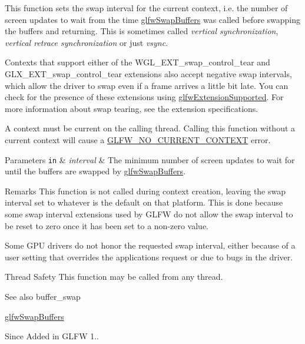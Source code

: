 This function sets the swap interval for the current context, i.\+e. the number of screen updates to wait from the time \hyperlink{group__window_gafb827800eedbfcbc97b1e5408df668d7}{glfw\+Swap\+Buffers} was called before swapping the buffers and returning. This is sometimes called {\itshape vertical synchronization}, {\itshape vertical retrace synchronization} or just {\itshape vsync}.

Contexts that support either of the {\ttfamily W\+G\+L\+\_\+\+E\+X\+T\+\_\+swap\+\_\+control\+\_\+tear} and {\ttfamily G\+L\+X\+\_\+\+E\+X\+T\+\_\+swap\+\_\+control\+\_\+tear} extensions also accept negative swap intervals, which allow the driver to swap even if a frame arrives a little bit late. You can check for the presence of these extensions using \hyperlink{group__context_ga9a28c712d35f9e43534e1d03b051c04c}{glfw\+Extension\+Supported}. For more information about swap tearing, see the extension specifications.

A context must be current on the calling thread. Calling this function without a current context will cause a \hyperlink{group__errors_gaa8290386e9528ccb9e42a3a4e16fc0d0}{G\+L\+F\+W\+\_\+\+N\+O\+\_\+\+C\+U\+R\+R\+E\+N\+T\+\_\+\+C\+O\+N\+T\+E\+X\+T} error.


\begin{DoxyParams}[1]{Parameters}
\mbox{\tt in}  & {\em interval} & The minimum number of screen updates to wait for until the buffers are swapped by \hyperlink{group__window_gafb827800eedbfcbc97b1e5408df668d7}{glfw\+Swap\+Buffers}.\\
\hline
\end{DoxyParams}
\begin{DoxyRemark}{Remarks}
This function is not called during context creation, leaving the swap interval set to whatever is the default on that platform. This is done because some swap interval extensions used by G\+L\+F\+W do not allow the swap interval to be reset to zero once it has been set to a non-\/zero value.

Some G\+P\+U drivers do not honor the requested swap interval, either because of a user setting that overrides the application\textquotesingle{}s request or due to bugs in the driver.
\end{DoxyRemark}
\begin{DoxyParagraph}{Thread Safety}
This function may be called from any thread.
\end{DoxyParagraph}
\begin{DoxySeeAlso}{See also}
buffer\+\_\+swap 

\hyperlink{group__window_gafb827800eedbfcbc97b1e5408df668d7}{glfw\+Swap\+Buffers}
\end{DoxySeeAlso}
\begin{DoxySince}{Since}
Added in G\+L\+F\+W 1.. 
\end{DoxySince}
